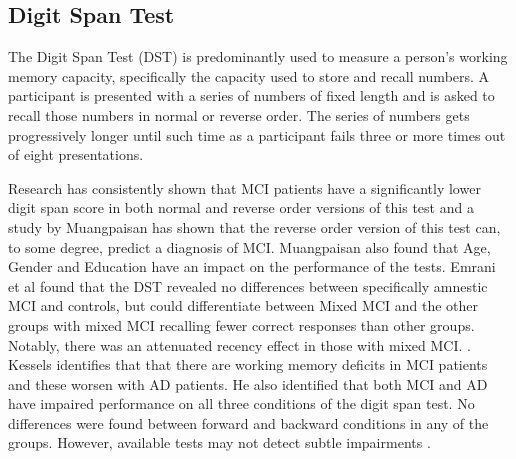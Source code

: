 \documentclass[10pt, letterpaper, twoside, openany]{book}
\begin{document}
\subsection{Digit Span Test}
The Digit Span Test (DST) is predominantly used to measure a person's working memory capacity, specifically the capacity used to store and recall numbers. A participant is presented with a series of numbers of fixed length and is asked to recall those numbers in normal or reverse order. The series of numbers gets progressively longer until such time as a participant fails three or more times out of eight presentations.
\par
Research has consistently shown that MCI patients have a significantly lower digit span score in both normal and reverse order versions of this test and a study by Muangpaisan has shown that the reverse order version of this test can, to some degree, predict a diagnosis of MCI. Muangpaisan also found that Age, Gender and Education have an impact on the performance of the tests. Emrani et al found that the DST revealed no differences between specifically amnestic MCI and controls, but could differentiate between Mixed MCI and the other groups with mixed MCI recalling fewer correct responses than other groups. Notably, there was an attenuated recency effect in those with mixed MCI. \cite{Emrani2018}. Kessels identifies that that there are working memory deficits in MCI patients and these worsen with AD patients. \cite{Kessels2011} He also identified that both MCI and AD have impaired performance on all three conditions of the digit span test. No differences were found between forward and backward conditions in any of the groups. However, available tests may not detect subtle impairments \cite{Kessels2015}.
\end{document}
